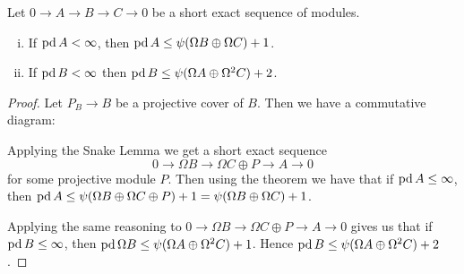 \begin{cor}\label{cor:projdim_bounded_by_psi}
	Let $0 \to A \to B \to C \to 0$ be a short exact sequence of modules. 
	\begin{enumerate}[i)]
		\item If $\operatorname{pd} A < \infty$, then $\operatorname{pd} A \leq \psi(\Omega B \oplus \Omega C)+1$.
		\item If $\operatorname{pd} B < \infty$ then $\operatorname{pd} B \leq \psi(\Omega A \oplus \Omega^2 C) + 2$.
	\end{enumerate}
	\begin{proof}
		Let $P_B \to B$ be a projective cover of $B$. Then we have a commutative diagram:
		\begin{center}
		\end{center}
		Applying the Snake Lemma we get a short exact sequence $$0 \to \Omega B \to \Omega C \oplus P \to A \to 0$$ for some projective module $P$. Then using the theorem we have that if $\operatorname{pd} A \leq \infty$, then $\operatorname{pd} A \leq \psi(\Omega B \oplus \Omega C \oplus P) + 1 = \psi(\Omega B \oplus \Omega C) + 1$.
		
		Applying the same reasoning to $0 \to \Omega B \to \Omega C \oplus P \to A \to 0$ gives us that if $\operatorname{pd} B \leq \infty$, then $\operatorname{pd}\Omega B \leq \psi(\Omega A \oplus \Omega^2 C) + 1$. Hence $\operatorname{pd} B \leq  \psi(\Omega A \oplus \Omega^2 C) + 2$.
	\end{proof}
\end{cor}

